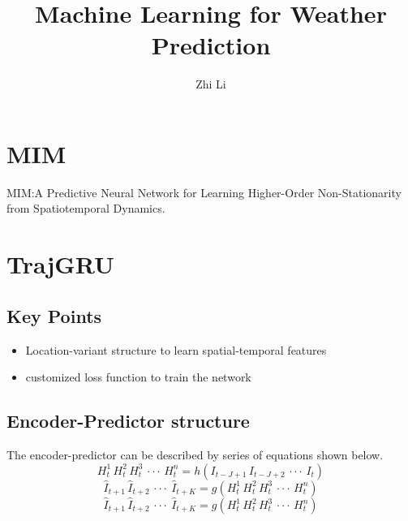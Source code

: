 \documentclass{article}
\begin{document}
\title{Machine Learning for Weather Prediction}
\author{Zhi Li}
\maketitle
\section{MIM}
MIM:A Predictive Neural Network for Learning Higher-Order Non-Stationarity from Spatiotemporal Dynamics. 

\section{TrajGRU}
\subsection{Key Points}
\begin{itemize}
\item Location-variant structure to learn spatial-temporal features
\item customized loss function to train the network
\end{itemize}

\subsection{Encoder-Predictor structure}
The encoder-predictor can be described by series of equations shown below. 
\begin{equation}
H_{t}^1\, H_t^2\, H_t^3\,\cdot\cdot\cdot\, H_t^n=h(I_{t-J+1}\,I_{t-J+2}\,\cdot\cdot\cdot \,I_{t})
\end{equation}
\begin{equation}
\hat{I}_{t+1}\,\hat{I}_{t+2}\,\cdot\cdot\cdot\ \hat{I}_{t+K}=g(H_{t}^1\, H_t^2\, H_t^3\,\cdot\cdot\cdot\, H_t^n)
\end{equation}
\begin{equation}
\hat{I}_{t+1}\,\hat{I}_{t+2}\,\cdot\cdot\cdot\ \hat{I}_{t+K}=g(H_{t}^1\, H_t^2\, H_t^3\,\cdot\cdot\cdot\, H_t^n)
\end{equation}
\end{document}
